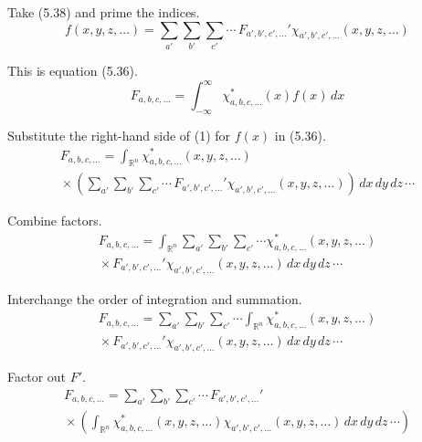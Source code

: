 


Take (5.38) and prime the indices.
\begin{equation*}
f(x,y,z,\ldots)=\sum_{a'}\sum_{b'}\sum_{c'}\cdots\,F_{a',b',c',\ldots}'\chi_{a',b',c',\ldots}(x,y,z,\ldots)
\tag{1}
\end{equation*}

This is equation (5.36).
\begin{equation*}
F_{a,b,c,\ldots}=\int_{-\infty}^\infty \chi_{a,b,c,\ldots}^*(x)f(x)\,dx
\tag{5.36}
\end{equation*}

Substitute the right-hand side of (1) for $f(x)$ in (5.36).
\begin{multline*}
F_{a,b,c,\ldots}
=\int_{\mathbb R^n}\chi_{a,b,c,\ldots}^*(x,y,z,\ldots)
\\
{}\times\left(\sum_{a'}\sum_{b'}\sum_{c'}\cdots\,F_{a',b',c',\ldots}'\chi_{a',b',c',\ldots}(x,y,z,\ldots)\right)
\,dx\,dy\,dz\,\cdots
\end{multline*}

Combine factors.
\begin{multline*}
F_{a,b,c,\ldots}
=\int_{\mathbb R^n}
\sum_{a'}\sum_{b'}\sum_{c'}\cdots
\chi_{a,b,c,\ldots}^*(x,y,z,\ldots)
\\
{}\times
F_{a',b',c',\ldots}'
\chi_{a',b',c',\ldots}(x,y,z,\ldots)
\,dx\,dy\,dz\,\cdots
\end{multline*}

Interchange the order of integration and summation.
\begin{multline*}
F_{a,b,c,\ldots}
=\sum_{a'}\sum_{b'}\sum_{c'}\cdots\int_{\mathbb R^n}
\chi_{a,b,c,\ldots}^*(x,y,z,\ldots)
\\
{}\times
F_{a',b',c',\ldots}'
\chi_{a',b',c',\ldots}(x,y,z,\ldots)
\,dx\,dy\,dz\,\cdots
\end{multline*}

Factor out $F'$.
\begin{multline*}
F_{a,b,c,\ldots}
=\sum_{a'}\sum_{b'}\sum_{c'}\cdots\,F_{a',b',c',\ldots}'
\\
{}\times\left(
\int_{\mathbb R^n}
\chi_{a,b,c,\ldots}^*(x,y,z,\ldots)
\chi_{a',b',c',\ldots}(x,y,z,\ldots)
\,dx\,dy\,dz\,\cdots
\right)
\end{multline*}

